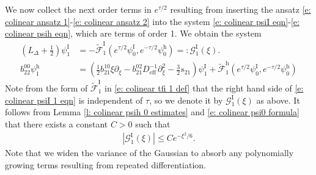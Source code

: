 \documentclass[11pt]{article}
\numberwithin{equation}{section}
\numberwithin{prop}{section}
\newcommand{\psih}{\psi^\mathrm{h}}
\newcommand{\Deff}{D_\mathrm{eff}}
\newcommand{\GI}{\mathcal{G}^\mathrm{I}}
\newcommand{\tfi}{\tilde{\mathcal{F}}^\mathrm{I}}
\newcommand{\tfh}{\tilde{\mathcal{F}}^\mathrm{h}}
\newcommand{\psiI}{\psi^\mathrm{I}}
\begin{document}
We now collect the next order terms in $e^{\tau/2}$ resulting from inserting the ansatz \eqref{e: colinear ansatz 1}-\eqref{e: colinear ansatz 2} into the system \eqref{e: colinear psiI eqn}-\eqref{e: colinear psih eqn}, which are terms of order 1. We obtain the system
\begin{align}
\left(L_\Delta + \frac{1}{2} \right) \psiI_1 &= - \tfi_1 (e^{\tau/2} \psiI_0, e^{-\tau/2} \psih_0) =: \GI_1 (\xi). \label{e: colinear psiI 1 eqn} \\
b_{22}^{00} \psih_1 &= \left( \frac{1}{2}b_{21}^{10} \xi \partial_\xi - b_{21}^{02} \Deff^{-1} \partial_\xi^2 - \frac{3}{2} s_{21} \right) \psiI_1 + \tfh_1 (e^{\tau/2} \psiI_0, e^{-\tau/2} \psih_0) \label{e: colinear psih 1 eqn}
\end{align}
Note from the form of $\tfi_1$ in \eqref{e: colinear tfi 1 def} that the right hand side of \eqref{e: colinear psiI 1 eqn} is independent of $\tau$, so we denote it by $\GI_1(\xi)$ as above. It follows from Lemma \ref{l: colinear psih 0 estimates} and \eqref{e: colinear psi0 formula} that there exists a constant $C > 0$ such that
\begin{align}
|\GI_1(\xi)| \leq C e^{-\xi^2/6}. 
\end{align}
Note that we widen the variance of the Gaussian to absorb any polynomially growing terms resulting from repeated differentiation. 
\end{document}

